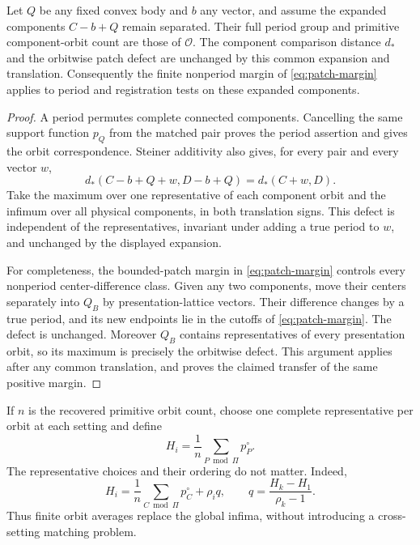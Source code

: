 \begin{lemma}
\label{lem:registration-period-margin}
Let $Q$ be any fixed convex body and $b$ any vector, and assume the
expanded components $C-b+Q$ remain separated. Their full period group
and primitive component-orbit count are those of $\mathcal O$.
The component comparison distance $d_*$ and the orbitwise patch
defect are unchanged by this common expansion and translation.
Consequently the finite nonperiod margin of
\eqref{eq:patch-margin} applies to period and registration tests on
these expanded components.
\end{lemma}
\begin{proof}
A period permutes complete connected components. Cancelling the same
support function $p_Q$ from the matched pair proves the period
assertion and gives the orbit correspondence. Steiner additivity
also gives, for every pair and every vector $w$,
\[
 d_*(C-b+Q+w,D-b+Q)=d_*(C+w,D).
\]
Take the maximum over one representative of each component orbit and
the infimum over all physical components, in both translation signs.
This defect is independent of the representatives, invariant under
adding a true period to $w$, and unchanged by the displayed expansion.

For completeness, the bounded-patch margin in
\eqref{eq:patch-margin} controls every nonperiod center-difference
class. Given any two components, move their centers separately into
$Q_B$ by presentation-lattice vectors. Their difference changes by
a true period, and its new endpoints lie in the cutoffs of
\eqref{eq:patch-margin}. The defect is unchanged. Moreover $Q_B$
contains representatives of every presentation orbit, so its
maximum is precisely the orbitwise defect. This argument applies
after any common translation, and proves the claimed transfer of
the same positive margin.
\end{proof}

If $n$ is the recovered primitive orbit count, choose one complete
representative per orbit at each setting and define
\begin{equation}\label{eq:registration-orbit-average}
 H_i=\frac1n\sum_{P\bmod\Pi}p_P^\circ.
\end{equation}
The representative choices and their ordering do not matter. Indeed,
\[
 H_i=\frac1n\sum_{C\bmod\Pi}p_C^\circ+\rho_iq,
                 \qquad q=\frac{H_k-H_1}{\rho_k-1}.
\]
Thus finite orbit averages replace the global infima, without
introducing a cross-setting matching problem.

